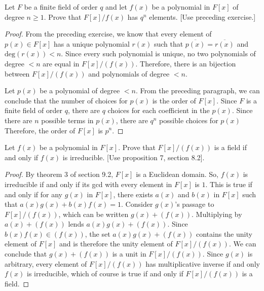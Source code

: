 \documentclass[10pt]{article}
\newenvironment{problem}[2][Problem]{\begin{trivlist}
		\item[\hskip \labelsep {\bfseries #1}\hskip \labelsep {\bfseries #2.}]}{\end{trivlist}}
\begin{document}
	\begin{problem}{2.2}
		Let $F$ be a finite field of order $q$ and let $f(x)$ be a polynomial in $F[x]$ of degree $n \geq 1$. Prove that $F[x]/f(x)$ has $q^n$ elements. [Use preceding exercise.]
		\begin{proof}
			From the preceding exercise, we know that every element of $p(x) \in F[x]$ has a unique polynomial $r(x)$ such that $\overline{p(x)} = \overline{r(x)}$ and $\text{deg}(r(x)) < n$. Since every such polynomial is unique, no two polynomials of degree $< n$ are equal in $F[x]/(f(x))$. Therefore, there is an bijection between $F[x]/(f(x))$ and polynomials of degree $< n$. 
			
			Let $p(x)$ be a polynomial of degree $< n$. From the preceding paragraph, we can conclude that the number of choices for $p(x)$ is the order of $F[x]$. Since $F$ is a finite field of order $q$, there are $q$ choices for each coefficient in the $p(x)$. Since there are $n$ possible terms in $p(x)$, there are $q^n$ possible choices for $p(x)$ Therefore, the order of $F[x]$ is $p^n$.
		\end{proof}
	\end{problem}
	
	\begin{problem}{2.3}
		Let $f(x)$ be a polynomial in $F[x]$. Prove that $F[x]/(f(x))$ is a field if and only if $f(x)$ is irreducible. [Use proposition 7, section 8.2].
		\begin{proof}
			By theorem 3 of section 9.2, $F[x]$ is a Euclidean domain. So, $f(x)$ is irreducible if and only if its gcd with every element in $F[x]$ is $1$. This is true if and only if for any $g(x)$ in $F[x]$, there exists $a(x)$ and $b(x)$ in $F[x]$ such that $a(x)g(x) + b(x)f(x) = 1$. Consider $g(x)$'s passage to $F[x]/(f(x))$, which can be written $g(x) + (f(x))$. Multiplying by $a(x) + (f(x))$ lends $a(x)g(x) + (f(x))$. Since $b(x)f(x) \in (f(x))$, the set $a(x)g(x) + (f(x))$ contains the unity element of $F[x]$ and is therefore the unity element of $F[x]/(f(x))$. We can conclude that $g(x) + (f(x))$ is a unit in $F[x]/(f(x))$. Since $g(x)$ is arbitrary, every element of $F[x]/(f(x))$ has multiplicative inverse if and only $f(x)$ is irreducible, which of course is true if and only if $F[x]/(f(x))$ is a field.
		\end{proof}
	\end{problem}
		
\end{document}
